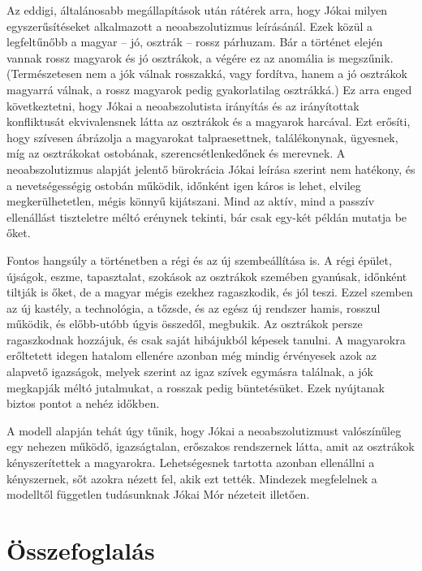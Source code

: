 \documentclass[a4paper,12pt]{thesis-ekf}
\begin{document}
    Az eddigi, általánosabb megállapítások után rátérek arra, hogy Jókai milyen egyszerűsítéseket alkalmazott
        a neoabszolutizmus leírásánál.
    Ezek közül a legfeltűnőbb a magyar – jó, osztrák – rossz párhuzam.
    Bár a történet elején vannak rossz magyarok és jó osztrákok, a végére ez az anomália is megszűnik.
    (Természetesen nem a jók válnak rosszakká, vagy fordítva, hanem a jó osztrákok magyarrá válnak,
        a rossz magyarok pedig gyakorlatilag osztrákká.)
    Ez arra enged következtetni, hogy Jókai a neoabszolutista irányítás és az irányítottak konfliktusát
        ekvivalensnek látta az osztrákok és a magyarok harcával.
    Ezt erősíti, hogy szívesen ábrázolja a magyarokat talpraesettnek, találékonynak, ügyesnek,
        míg az osztrákokat ostobának, szerencsétlenkedőnek és merevnek.
    A neoabszolutizmus alapját jelentő bürokrácia Jókai leírása szerint nem hatékony, és a nevetségességig
        ostobán működik, időnként igen káros is lehet, elvileg megkerülhetetlen, mégis könnyű kijátszani.
    Mind az aktív, mind a passzív ellenállást tiszteletre méltó erénynek tekinti, bár csak egy-két példán mutatja be őket.

    Fontos hangsúly a történetben a régi és az új szembeállítása is.
    A régi épület, újságok, eszme, tapasztalat, szokások az osztrákok szemében gyanúsak, időnként tiltják is őket,
        de a magyar mégis ezekhez ragaszkodik, és jól teszi.
    Ezzel szemben az új kastély, a technológia, a tőzsde, és az egész új rendszer hamis, rosszul működik,
        és előbb-utóbb úgyis összedől, megbukik.
    Az osztrákok persze ragaszkodnak hozzájuk, és csak saját hibájukból képesek tanulni.
    A magyarokra erőltetett idegen hatalom ellenére azonban még mindig érvényesek azok az alapvető igazságok,
        melyek szerint az igaz szívek egymásra találnak, a jók megkapják méltó jutalmukat, a rosszak pedig büntetésüket.
    Ezek nyújtanak biztos pontot a nehéz időkben.

    A modell alapján tehát úgy tűnik, hogy Jókai a neoabszolutizmust valószínűleg egy nehezen működő, igazságtalan,
        erőszakos rendszernek látta, amit az osztrákok kényszerítettek a magyarokra.
    Lehetségesnek tartotta azonban ellenállni a kényszernek, sőt azokra nézett fel, akik ezt tették.
    Mindezek megfelelnek a modelltől független tudásunknak Jókai Mór nézeteit illetően.

    \chapter{Összefoglalás}
\end{document}
